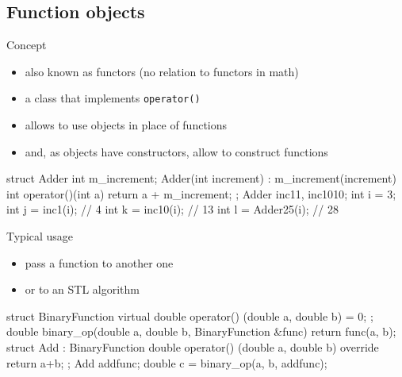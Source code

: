 \subsection[()]{Function objects}

\begin{frame}[fragile]
  \begin{block}{Concept}
    \begin{itemize}
    \item also known as functors (no relation to functors in math)
    \item a class that implements \texttt{operator()}
    \item allows to use objects in place of functions
    \item and, as objects have constructors, allow to construct functions
    \end{itemize}
  \end{block}
  \begin{cppcode}
    struct Adder {
      int m_increment;
      Adder(int increment) : m_increment(increment) {}
      int operator()(int a) { return a + m_increment; }
    };
    Adder inc1{1}, inc10{10};
    int i = 3;
    int j = inc1(i);  // 4
    int k = inc10(i); // 13
    int l = Adder{25}(i); // 28
  \end{cppcode}
\end{frame}

\begin{frame}[fragile]
  \begin{block}{Typical usage}
    \begin{itemize}
    \item pass a function to another one
    \item or to an STL algorithm
    \end{itemize}
  \end{block}
  \begin{cppcode}
    struct BinaryFunction {
      virtual double operator() (double a, double b) = 0;
    };
    double binary_op(double a, double b, BinaryFunction &func) {
      return func(a, b);
    }
    struct Add : BinaryFunction {
      double operator() (double a, double b) override
      { return a+b; }
    };
    Add addfunc;
    double c = binary_op(a, b, addfunc);
  \end{cppcode}
\end{frame}
